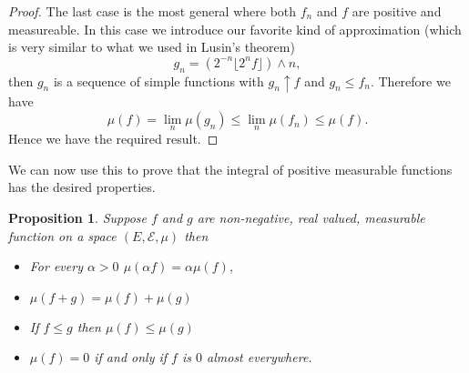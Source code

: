 \documentclass[11pt]{article}
\newtheorem{prp}[thm]{Proposition}
\theoremstyle{definition}
\theoremstyle{remark}
\begin{document}
\begin{proof}
The last case is the most general where both $f_n$ and $f$ are positive and measureable. In this case we introduce our favorite kind of approximation (which is very similar to what we used in Lusin's theorem)
\[ g_n = \left( 2^{-n} \lfloor 2^n f \rfloor \right) \wedge n, \] then $g_n$ is a sequence of simple functions with $g_n \uparrow f$ and $g_n \leq f_n$. Therefore we have
\[ \mu(f) = \lim_n \mu(g_n) \leq \lim_n \mu(f_n) \leq \mu(f). \] Hence we have the required result.
\end{proof}

We can now use this to prove that the integral of positive measurable functions has the desired properties. 
\begin{prp}
Suppose $f$ and $g$ are non-negative, real valued, measurable function on a space $(E, \mathcal{E}, \mu)$ then 
\begin{itemize}
\item For every $\alpha>0$ $\mu(\alpha f) = \alpha \mu(f)$,
\item $\mu(f+g) = \mu(f) + \mu(g)$
\item If $f \leq g$ then $\mu(f) \leq \mu(g)$
\item $\mu(f) = 0$ if and only if $f$ is $0$ almost everywhere.
\end{itemize}
\end{prp}
\end{document}
